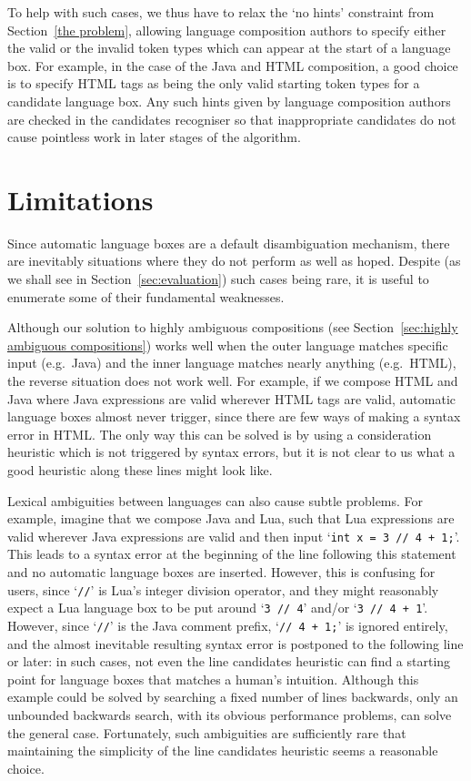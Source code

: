 \documentclass[sigplan,screen]{acmart}
\begin{document}
To help with such cases, we thus have to relax the `no hints' constraint from
Section~\ref{the problem}, allowing language composition authors to specify
either the valid or the invalid token types which can appear at the start of
a language box. For example, in the case of the Java and HTML composition, a
good choice is to specify HTML tags as being the only valid starting token
types for a candidate language box. Any such hints given by language composition authors
are checked in the candidates recogniser so that inappropriate candidates do
not cause pointless work in later stages of the algorithm.


\section{Limitations}
\label{sec:lbox_limitations}

Since automatic language boxes are a default disambiguation mechanism,
there are inevitably situations where they do not perform as well as hoped.
Despite (as we shall see in Section~\ref{sec:evaluation}) such cases being
rare, it is useful to enumerate some of their fundamental weaknesses.

Although our solution to highly ambiguous compositions (see Section~\ref{sec:highly
ambiguous compositions}) works well when the outer language matches specific
input (e.g.~Java) and the inner language matches nearly anything (e.g.~HTML),
the reverse situation does not work well. For example, if we compose HTML and Java where
Java expressions are valid wherever HTML tags are valid, automatic language
boxes almost never trigger, since there are few ways of making a syntax error
in HTML. The only way this can be solved is by using a consideration
heuristic which is not triggered by syntax errors, but it is not clear to
us what a good heuristic along these lines might look like.

Lexical ambiguities between languages can also cause subtle problems. For
example, imagine that we compose Java and Lua, such that Lua expressions are
valid wherever Java expressions are valid and then input `\texttt{int x = 3 //
4 + 1;}'. This leads to a syntax error at the beginning of the line following
this statement and no automatic language boxes are inserted. However, this is
confusing for users, since `\texttt{//}' is Lua's integer division operator,
and they might reasonably expect a Lua language box to be put around `\texttt{3
// 4}' and/or `\texttt{3 // 4 + 1}'. However, since `\texttt{//}' is the Java
comment prefix, `\texttt{// 4 + 1;}' is ignored entirely, and the almost inevitable resulting
syntax error is postponed to the following line or later: in such cases, not even
the line candidates heuristic can find a starting point for language boxes that
matches a human's intuition. Although this example could be solved by searching
a fixed number of lines backwards, only an unbounded backwards
search, with its obvious performance problems, can solve the general case.
Fortunately, such ambiguities are sufficiently rare that maintaining the simplicity
of the line candidates heuristic seems a reasonable choice.
\end{document}
